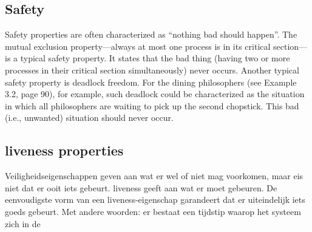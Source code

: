 \documentclass{article}
\begin{document}
	\subsection{Safety}
	
	Safety properties are often characterized as “nothing bad should happen”. The mutual
	exclusion property—always at most one process is in its critical section—is a typical safety
	property. It states that the bad thing (having two or more processes in their critical section
	simultaneously) never occurs. Another typical safety property is deadlock freedom. For
	the dining philosophers (see Example 3.2, page 90), for example, such deadlock could be
	characterized as the situation in which all philosophers are waiting to pick up the second
	chopstick. This bad (i.e., unwanted) situation should never occur.
	\subsection{liveness properties}
	Veiligheidseigenschappen geven aan wat er wel of niet mag voorkomen,
	maar eis niet dat er ooit iets gebeurt. liveness geeft aan wat er moet gebeuren. De eenvoudigste vorm van een liveness-eigenschap garandeert dat er uiteindelijk iets goeds gebeurt.
	Met andere woorden: er bestaat een tijdstip waarop het systeem zich in de
	
\end{document}
